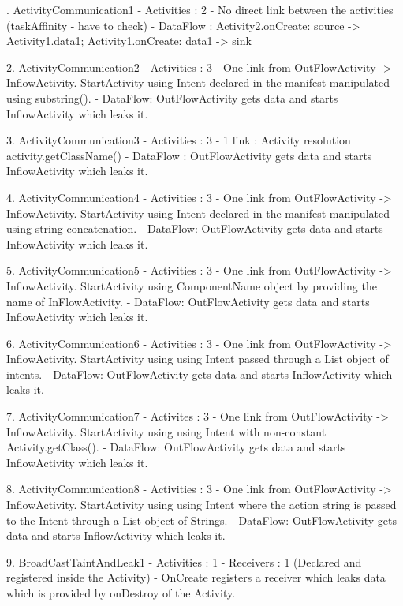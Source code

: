 . ActivityCommunication1
 - Activities : 2
 - No direct link between the activities (taskAffinity - have to check)
 - DataFlow : Activity2.onCreate: source -> Activity1.data1; Activity1.onCreate: data1 -> sink
 
2. ActivityCommunication2
 - Activities : 3
 - One link from OutFlowActivity -> InflowActivity. StartActivity using Intent declared in the manifest manipulated using substring(). 
 - DataFlow: OutFlowActivity gets data and starts InflowActivity which leaks it.

3. ActivityCommunication3
 - Activities : 3
 - 1 link : Activity resolution activity.getClassName()
 - DataFlow : OutFlowActivity gets data and starts InflowActivity which leaks it.
 
4. ActivityCommunication4
 - Activities : 3
 - One link from OutFlowActivity -> InflowActivity. StartActivity using Intent declared in the manifest manipulated using string concatenation. 
 - DataFlow: OutFlowActivity gets data and starts InflowActivity which leaks it.
 
5. ActivityCommunication5
 - Activities : 3
 - One link from OutFlowActivity -> InflowActivity. StartActivity using ComponentName object by providing the name of InFlowActivity. 
 - DataFlow: OutFlowActivity gets data and starts InflowActivity which leaks it.
 
6. ActivityCommunication6
 - Activities : 3
 - One link from OutFlowActivity -> InflowActivity. StartActivity using using Intent passed through a List object of intents. 
 - DataFlow: OutFlowActivity gets data and starts InflowActivity which leaks it.
 
7. ActivityCommunication7
 - Activites : 3
 - One link from OutFlowActivity -> InflowActivity. StartActivity using using Intent with non-constant Activity.getClass(). 
 - DataFlow: OutFlowActivity gets data and starts InflowActivity which leaks it.
 
8. ActivityCommunication8
 - Activities : 3
 - One link from OutFlowActivity -> InflowActivity. StartActivity using using Intent where the action string is passed to the Intent through a List object of Strings. 
 - DataFlow: OutFlowActivity gets data and starts InflowActivity which leaks it.
 
9. BroadCastTaintAndLeak1
 - Activities : 1
 - Receivers : 1 (Declared and registered inside the Activity)
 - OnCreate registers a receiver which leaks data which is provided by onDestroy of the Activity.
 

